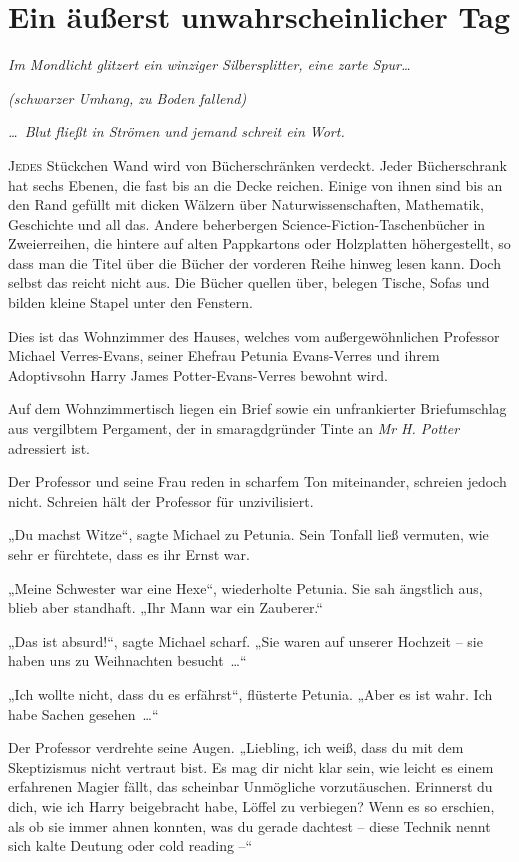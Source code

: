 \chapter{Ein äußerst unwahrscheinlicher Tag}

\noindent \emph{Im Mondlicht glitzert ein winziger Silbersplitter, eine zarte Spur…}

\noindent \emph{(schwarzer Umhang, zu Boden fallend)}

\noindent \emph{… Blut fließt in Strömen und jemand schreit ein Wort.}

\later

\lettrine{J}{edes} Stückchen Wand wird von Bücherschränken verdeckt. Jeder Bücherschrank hat sechs Ebenen, die fast bis an die Decke reichen. Einige von ihnen sind bis an den Rand gefüllt mit dicken Wälzern über Naturwissenschaften, Mathematik, Geschichte und all das. Andere beherbergen Science-Fiction-Taschenbücher in Zweierreihen, die hintere auf alten Pappkartons oder Holzplatten höhergestellt, so dass man die Titel über die Bücher der vorderen Reihe hinweg lesen kann. Doch selbst das reicht nicht aus. Die Bücher quellen über, belegen Tische, Sofas und bilden kleine Stapel unter den Fenstern.

Dies ist das Wohnzimmer des Hauses, welches vom außergewöhnlichen Professor Michael Verres-Evans, seiner Ehefrau Petunia Evans-Verres und ihrem Adoptivsohn Harry James Potter-Evans-Verres bewohnt wird.

Auf dem Wohnzimmertisch liegen ein Brief sowie ein unfrankierter Briefumschlag aus vergilbtem Pergament, der in smaragdgründer Tinte an \emph{Mr H. Potter} adressiert ist.

Der Professor und seine Frau reden in scharfem Ton miteinander, schreien jedoch nicht. Schreien hält der Professor für unzivilisiert.

„Du machst Witze“, sagte Michael zu Petunia. Sein Tonfall ließ vermuten, wie sehr er fürchtete, dass es ihr Ernst war.

„Meine Schwester war eine Hexe“, wiederholte Petunia. Sie sah ängstlich aus, blieb aber standhaft. „Ihr Mann war ein Zauberer.“

„Das ist absurd!“, sagte Michael scharf. „Sie waren auf unserer Hochzeit – sie haben uns zu Weihnachten besucht …“

„Ich wollte nicht, dass du es erfährst“, flüsterte Petunia. „Aber es ist wahr. Ich habe Sachen gesehen …“

Der Professor verdrehte seine Augen. „Liebling, ich weiß, dass du mit dem Skeptizismus nicht vertraut bist. Es mag dir nicht klar sein, wie leicht es einem erfahrenen Magier fällt, das scheinbar Unmögliche vorzutäuschen. Erinnerst du dich, wie ich Harry beigebracht habe, Löffel zu verbiegen? Wenn es so erschien, als ob sie immer ahnen konnten, was du gerade dachtest – diese Technik nennt sich kalte Deutung oder cold reading –“

